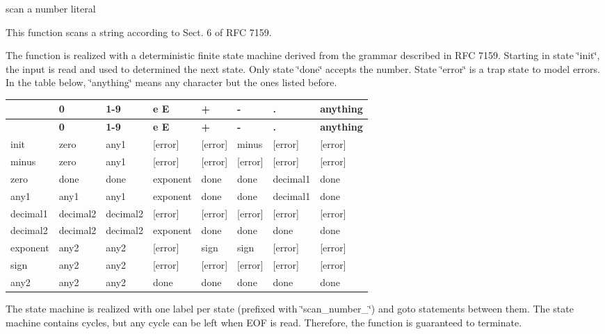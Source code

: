 scan a number literal 

This function scans a string according to Sect. 6 of R\+FC 7159.

The function is realized with a deterministic finite state machine derived from the grammar described in R\+FC 7159. Starting in state \char`\"{}init\char`\"{}, the input is read and used to determined the next state. Only state \char`\"{}done\char`\"{} accepts the number. State \char`\"{}error\char`\"{} is a trap state to model errors. In the table below, \char`\"{}anything\char`\"{} means any character but the ones listed before.

\tabulinesep=1mm
\begin{longtabu} spread 0pt [c]{*8{|X[-1]}|}
\hline
{}&{\bf 0 }&{\bf 1-\/9 }&{\bf e E }&{\bf + }&{\bf -\/ }&{\bf . }&{\bf anything  }\\
\endfirsthead
\hline
\endfoot
\hline
{}&{\bf 0 }&{\bf 1-\/9 }&{\bf e E }&{\bf + }&{\bf -\/ }&{\bf . }&{\bf anything  }\\
\endhead
init &zero &any1 &\mbox{[}error\mbox{]} &\mbox{[}error\mbox{]} &minus &\mbox{[}error\mbox{]} &\mbox{[}error\mbox{]} \\
minus &zero &any1 &\mbox{[}error\mbox{]} &\mbox{[}error\mbox{]} &\mbox{[}error\mbox{]} &\mbox{[}error\mbox{]} &\mbox{[}error\mbox{]} \\
zero &done &done &exponent &done &done &decimal1 &done \\
any1 &any1 &any1 &exponent &done &done &decimal1 &done \\
decimal1 &decimal2 &decimal2 &\mbox{[}error\mbox{]} &\mbox{[}error\mbox{]} &\mbox{[}error\mbox{]} &\mbox{[}error\mbox{]} &\mbox{[}error\mbox{]} \\
decimal2 &decimal2 &decimal2 &exponent &done &done &done &done \\
exponent &any2 &any2 &\mbox{[}error\mbox{]} &sign &sign &\mbox{[}error\mbox{]} &\mbox{[}error\mbox{]} \\
sign &any2 &any2 &\mbox{[}error\mbox{]} &\mbox{[}error\mbox{]} &\mbox{[}error\mbox{]} &\mbox{[}error\mbox{]} &\mbox{[}error\mbox{]} \\
any2 &any2 &any2 &done &done &done &done &done \\
\end{longtabu}
The state machine is realized with one label per state (prefixed with \char`\"{}scan\+\_\+number\+\_\+\char`\"{}) and {\ttfamily goto} statements between them. The state machine contains cycles, but any cycle can be left when E\+OF is read. Therefore, the function is guaranteed to terminate.

